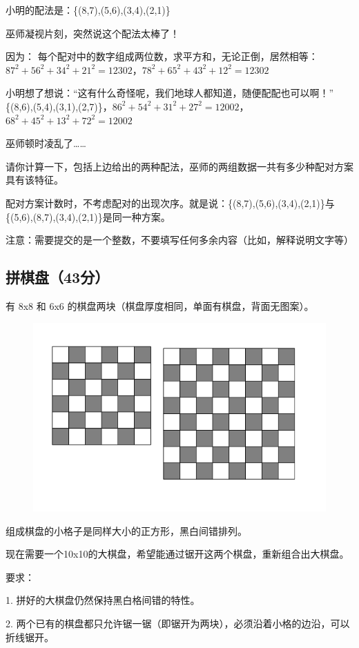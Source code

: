 \documentclass[a4paper, 12pt, twocolumn]{ctexart}
\begin{document}
	小明的配法是：\{(8,7),(5,6),(3,4),(2,1)\}
	
	巫师凝视片刻，突然说这个配法太棒了！
	
	因为：	每个配对中的数字组成两位数，求平方和，无论正倒，居然相等：$87^2 + 56^2 + 34^2 + 21^2  =  12302$，$78^2 + 65^2 + 43^2 + 12^2  =  12302$
	
	小明想了想说：“这有什么奇怪呢，我们地球人都知道，随便配配也可以啊！”
	\{(8,6),(5,4),(3,1),(2,7)\}，$86^2 + 54^2 + 31^2 + 27^2 = 12002$，$68^2 + 45^2 + 13^2 + 72^2 = 12002$
	
	巫师顿时凌乱了……
	
	请你计算一下，包括上边给出的两种配法，巫师的两组数据一共有多少种配对方案具有该特征。
	
	配对方案计数时，不考虑配对的出现次序。就是说：\{(8,7),(5,6),(3,4),(2,1)\}与\{(5,6),(8,7),(3,4),(2,1)\}是同一种方案。
	
	注意：需要提交的是一个整数，不要填写任何多余内容（比如，解释说明文字等）
	
	\subsection{拼棋盘（43分）}
	
	有 8x8 和 6x6 的棋盘两块（棋盘厚度相同，单面有棋盘，背面无图案）。
	
	\begin{figure}[H]
		\centering
		\includegraphics[width=0.8\linewidth]{001.png}
	\end{figure}
	
	组成棋盘的小格子是同样大小的正方形，黑白间错排列。
	
	现在需要一个10x10的大棋盘，希望能通过锯开这两个棋盘，重新组合出大棋盘。
	
	要求：
	
	1. 拼好的大棋盘仍然保持黑白格间错的特性。
	
	2. 两个已有的棋盘都只允许锯一锯（即锯开为两块），必须沿着小格的边沿，可以折线锯开。
	
\end{document}

